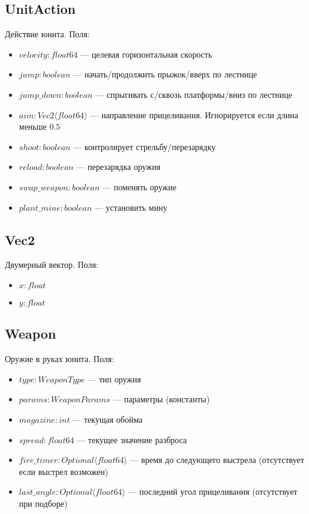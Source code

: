 \subsection{UnitAction}
Действие юнита. Поля:
\begin{itemize}
    \item $velocity : float64$ --- целевая горизонтальная скорость
    \item $jump : boolean$ --- начать/продолжить прыжок/вверх по лестнице
    \item $jump\_down : boolean$ --- спрыгивать с/сквозь платформы/вниз по лестнице
    \item $aim : Vec2 \langle float64 \rangle$ --- направление прицеливания. Игнорируется если длина меньше $0.5$
    \item $shoot : boolean$ --- контролирует стрельбу/перезарядку
    \item $reload : boolean$ --- перезарядка оружия
    \item $swap\_weapon : boolean$ --- поменять оружие
    \item $plant\_mine : boolean$ --- установить мину
\end{itemize}

\subsection{Vec2}
Двумерный вектор. Поля:
\begin{itemize}
    \item $x : float$
    \item $y : float$
\end{itemize}

\subsection{Weapon}
Оружие в руках юнита. Поля:
\begin{itemize}
    \item $type : WeaponType$ --- тип оружия
    \item $params : WeaponParams$ --- параметры (константы)
    \item $magazine : int$ --- текущая обойма
    \item $spread : float64$ --- текущее значение разброса
    \item $fire\_timer : Optional \langle float64 \rangle$ --- время до следующего выстрела (отсутствует если выстрел возможен)
    \item $last\_angle : Optional \langle float64 \rangle$ --- последний угол прицеливания (отсутствует при подборе)
\end{itemize}

